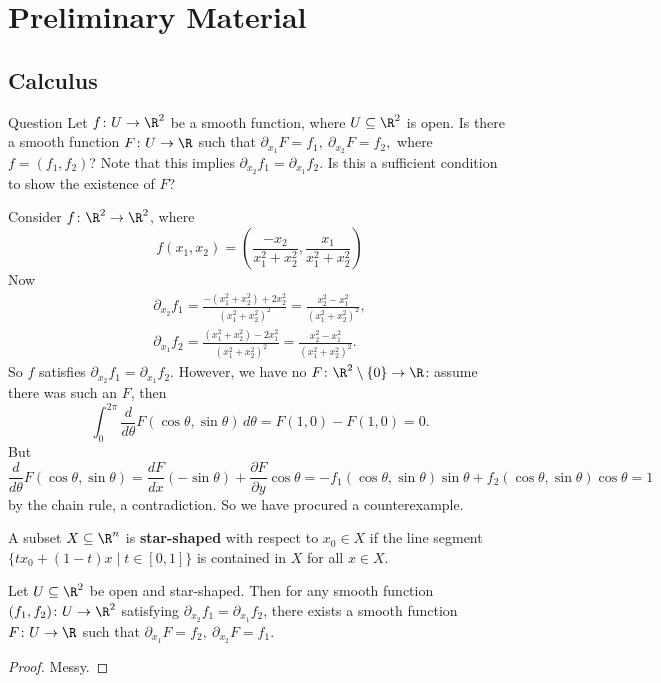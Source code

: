 \newcommand\sgn{\ensuremath{\operatorname{sgn}}} %

\section{Preliminary Material}
\subsection{Calculus}
\begin{namedthing}{Question}
    Let $f \colon U \to \R^2$ be a smooth function, where $U \subseteq \R^2$ is open. Is there a smooth function $F \colon U \to \R$ such that $\partial _{x_1}F=f_1, \ \partial _{x_2}F=f_2,$ where $f=(f_1,f_2)$? Note that this implies $\partial _{x_2}f_1=\partial _{x_1}f_2$. Is this a sufficient condition to show the existence of $F$?
\end{namedthing}
\begin{example}\label{failure}
    Consider $f \colon \R^2 \to \R^2$, where \[
        f(x_1,x_2)= \left( \frac{-x_2}{x_1^2+x_2^2} , \frac{x_1}{x_1^2+x_2^2}\right) 
    \] Now  
    \begin{gather*}
        \partial _{x_2}f_1= \frac{-(x_1^2+x_2^2)+2x_2^2}{(x_1^2+x_2^2)^2}=\frac{x_2^2-x_1^2}{(x_1^2+x_2^2)^2},\\ 
        \partial _{x_1}f_2= \frac{(x_1^2+x_2^2)-2x_1^2}{(x_1^2+x_2^2)^2}=\frac{x_2^2-x_1^2}{(x_1^2+x_2^2)^2}.
    \end{gather*} So $f$ satisfies $\partial _{x_2}f_1=\partial _{x_1}f_2$. However, we have no $F \colon \R^2 \setminus \{0\} \to \R$: assume there was such an $F$, then \[
    \int_{0}^{2\pi } \frac{d}{d\theta}F(\cos \theta, \sin \theta) \, d\theta=F(1,0)-F(1,0)=0.
    \] But \[
    \frac{d}{d\theta}F( \cos \theta ,\sin  \theta)= \frac{dF}{dx}(-\sin \theta)+\frac{\partial F}{\partial y}\cos \theta=-f_1(\cos \theta, \sin \theta) \sin \theta+f_2 (\cos \theta, \sin \theta) \cos \theta=1
    \] by the chain rule, a contradiction. So we have procured a counterexample.
\end{example}
\begin{definition}
    A subset $X\subseteq \R^n $ is \textbf{star-shaped} with respect to $x_0\in X$ if the line segment $\{tx_0+(1-t)x\mid t \in [0,1]\} $ is contained in $X$ for all $x \in X$.
\end{definition}
\begin{theorem}\label{star}
    Let $U \subseteq \R^2$ be open and star-shaped. Then for any smooth function $(f_1,f_2) \colon U \to \R^2$ satisfying $\partial _{x_2}f_1=\partial _{x_1}f_2$, there exists a smooth function $F \colon U \to \R$ such that $\partial _{x_1}F=f_2, \ \partial _{x_2}F=f_1$.
\end{theorem}
\begin{proof}
    Messy.
\end{proof}

